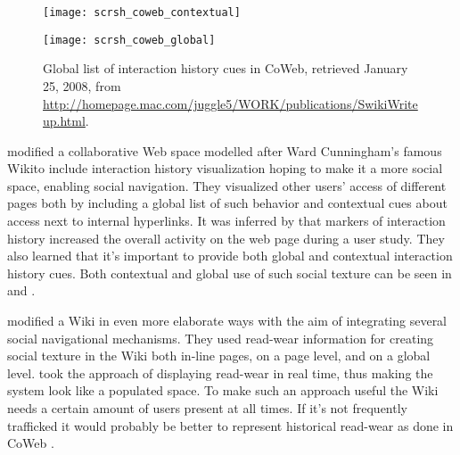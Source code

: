\begin{figure}
  \captionstyle{\raggedright}
  \begin{whole}
    \begin{minipage}[t]{0.475\wholewidth}
      \texttt{[image: scrsh\_coweb\_contextual]}
      \caption[CoWeb Contextual Cues]{%
        Contextual interaction history cues next to hyperlinks in CoWeb,
        retrieved January 25, 2008, from
        \url{http://homepage.mac.com/juggle5/WORK/publications/SwikiWriteup.html}.
      }
      \label{figure:scrsh.coweb.contextual}
    \end{minipage}
    \hfill
    \begin{minipage}[t]{0.475\wholewidth}
      \texttt{[image: scrsh\_coweb\_global]}
      \caption[CoWeb Global Cues]{%
        Global list of interaction history cues in CoWeb,
        retrieved January 25, 2008, from
        \url{http://homepage.mac.com/juggle5/WORK/publications/SwikiWriteup.html}.
      }
      \label{figure:scrsh.coweb.global}
    \end{minipage}
  \end{whole}
  \normalcaption
\end{figure}

\citet{dieberger00a} modified \dash{}a collaborative Web space
modelled after Ward Cunningham's famous Wiki\dash{}to include interaction
history visualization hoping to make it a more social space, enabling social
navigation. They visualized other users' access of different pages both by
including a global list of such behavior and contextual cues about access
next to internal hyperlinks.
It was inferred by \citeauthor{dieberger00a} that markers of interaction
history increased the overall activity on the web page during a user study.
They also learned that it's important to provide both global and
contextual interaction history cues. Both
contextual and global use of such social texture can be seen in
 and .

\citet{xu06} modified a Wiki in even more elaborate ways
with the aim of integrating several social navigational mechanisms.
They used read-wear information for creating social
texture in the Wiki both in-line pages, on a page level, and on a global
level. \citeauthor{xu06} took the approach of displaying read-wear in real
time, thus making the system look like a populated space. To make such an
approach useful the Wiki needs a certain amount of users present at all times.
If it's not frequently trafficked it would probably be better to represent
historical read-wear as done in CoWeb \citep[]{dieberger00a}.

